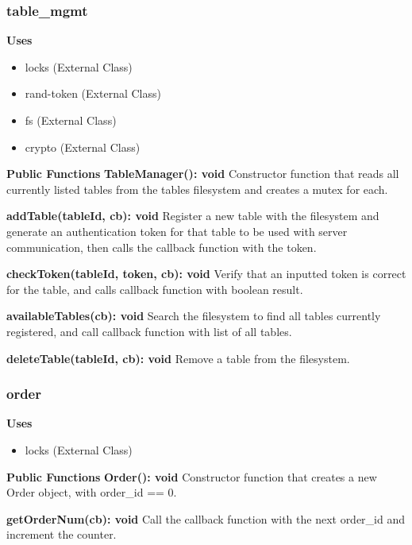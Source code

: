 \documentclass [10pt]{article}
\begin{document}

\subsubsection{table\_mgmt}
\textbf{Uses}
\begin{itemize}
	\item locks (External Class)
	\item rand-token (External Class)
	\item fs (External Class)
	\item crypto (External Class)
\end{itemize}

\textbf{Public Functions}
\textbf{TableManager(): void}
Constructor function that reads all currently listed tables from the tables filesystem and creates a mutex for each.

\textbf{addTable(tableId, cb): void}
Register a new table with the filesystem and generate an authentication token for that table to be used with server communication, then calls the callback function with the token.

\textbf{checkToken(tableId, token, cb): void}
Verify that an inputted token is correct for the table, and calls callback function with boolean result.

\textbf{availableTables(cb): void}
Search the filesystem to find all tables currently registered, and call callback function with list of all tables.

\textbf{deleteTable(tableId, cb): void}
Remove a table from the filesystem.


\subsubsection{order}
\textbf{Uses}
\begin{itemize}
	\item locks (External Class)
\end{itemize}

\textbf{Public Functions}
\textbf{Order(): void}
Constructor function that creates a new Order object, with order\_id == 0.

\textbf{getOrderNum(cb): void}
Call the callback function with the next order\_id and increment the counter.

\end{document}
